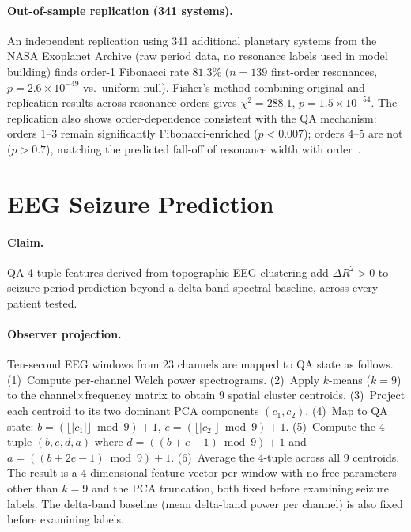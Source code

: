 \documentclass[11pt]{article}
\begin{document}
\paragraph{Out-of-sample replication (341 systems).}
An independent replication using 341 additional planetary systems from the
NASA Exoplanet Archive (raw period data, no resonance labels used in model
building) finds order-1 Fibonacci rate $81.3\%$ ($n = 139$ first-order resonances,
$p = 2.6\times10^{-49}$ vs.\ uniform null).
Fisher's method combining original and replication results across
resonance orders gives $\chi^2 = 288.1$, $p = 1.5\times10^{-54}$.
The replication also shows order-dependence consistent with the QA mechanism:
orders 1--3 remain significantly Fibonacci-enriched ($p < 0.007$);
orders 4--5 are not ($p > 0.7$), matching the predicted fall-off of
resonance width with order~\cite{dale2026fib}.

\section{EEG Seizure Prediction}\label{sec:eeg}

\paragraph{Claim.}
QA 4-tuple features derived from topographic EEG clustering add $\Delta R^2 > 0$
to seizure-period prediction beyond a delta-band spectral baseline,
across every patient tested.

\paragraph{Observer projection.}
Ten-second EEG windows from 23 channels are mapped to QA state as follows.
(1)~Compute per-channel Welch power spectrograms.
(2)~Apply $k$-means ($k=9$) to the channel$\times$frequency matrix to obtain
9 spatial cluster centroids.
(3)~Project each centroid to its two dominant PCA components $(c_1, c_2)$.
(4)~Map to QA state: $b = (\lfloor |c_1| \rfloor \bmod 9)+1$,
$e = (\lfloor |c_2| \rfloor \bmod 9)+1$.
(5)~Compute the 4-tuple $(b,e,d,a)$ where
$d = ((b+e-1)\bmod 9)+1$ and $a = ((b+2e-1)\bmod 9)+1$.
(6)~Average the 4-tuple across all 9 centroids.
The result is a 4-dimensional feature vector per window with no
free parameters other than $k=9$ and the PCA truncation,
both fixed before examining seizure labels.
The delta-band baseline (mean delta-band power per channel) is also fixed
before examining labels.
\end{document}
